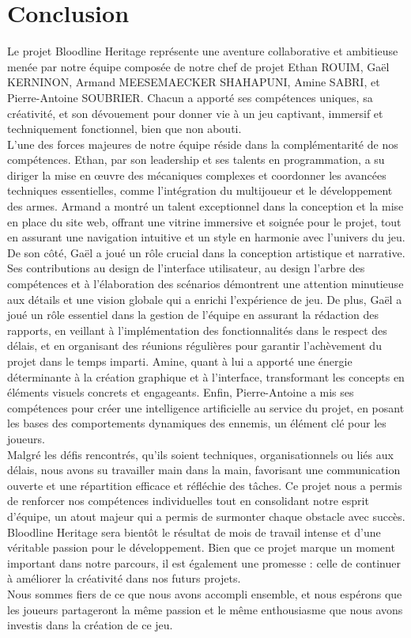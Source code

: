 \documentclass{report}
\begin{document}
\newpage
\chapter*{Conclusion}
Le projet Bloodline Heritage représente une aventure collaborative et ambitieuse menée par notre équipe composée de notre chef de projet Ethan ROUIM, Gaël KERNINON, Armand MEESEMAECKER SHAHAPUNI, Amine SABRI, et Pierre-Antoine SOUBRIER. Chacun a apporté ses compétences uniques, sa créativité, et son dévouement pour donner vie à un jeu captivant, immersif et techniquement fonctionnel, bien que non abouti.
\\[0.4cm]
L’une des forces majeures de notre équipe réside dans la complémentarité de nos compétences. Ethan, par son leadership et ses talents en programmation, a su diriger la mise en œuvre des mécaniques complexes et coordonner les avancées techniques essentielles, comme l’intégration du multijoueur et le développement des armes. Armand a montré un talent exceptionnel dans la conception et la mise en place du site web, offrant une vitrine immersive et soignée pour le projet, tout en assurant une navigation intuitive et un style en harmonie avec l’univers du jeu.
\\[0.4cm]
De son côté, Gaël a joué un rôle crucial dans la conception artistique et narrative. Ses contributions au design de l’interface utilisateur, au design l’arbre des compétences et à l’élaboration des scénarios démontrent une attention minutieuse aux détails et une vision globale qui a enrichi l’expérience de jeu. De plus, Gaël a joué un rôle essentiel dans la gestion de l'équipe en assurant la rédaction des rapports, en veillant à l'implémentation des fonctionnalités dans le respect des délais, et en organisant des réunions régulières pour garantir l'achèvement du projet dans le temps imparti.  Amine, quant à lui a apporté une énergie déterminante à la création graphique et à l’interface, transformant les concepts en éléments visuels concrets et engageants. Enfin, Pierre-Antoine a mis ses compétences pour créer une intelligence artificielle au service du projet, en posant les bases des comportements dynamiques des ennemis, un élément clé pour les joueurs.
\\[0.4cm]
Malgré les défis rencontrés, qu'ils soient techniques, organisationnels ou liés aux délais, nous avons su travailler main dans la main, favorisant une communication ouverte et une répartition efficace et réfléchie des tâches. Ce projet nous a permis de renforcer nos compétences individuelles tout en consolidant notre esprit d’équipe, un atout majeur qui a permis de surmonter chaque obstacle avec succès.
\\[0.4cm]
Bloodline Heritage sera bientôt le résultat de mois de travail intense et d’une véritable passion pour le développement. Bien que ce projet marque un moment important dans notre parcours, il est également une promesse : celle de continuer à améliorer la créativité dans nos futurs projets.
\\[0.4cm]
Nous sommes fiers de ce que nous avons accompli ensemble, et nous espérons que les joueurs partageront la même passion et le même enthousiasme que nous avons investis dans la création de ce jeu.
\end{document}

